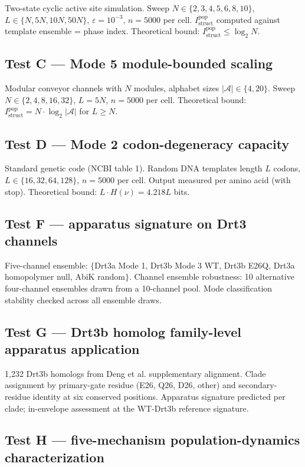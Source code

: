 \documentclass[aps,prx,reprint,amsmath,amssymb,floatfix,superscriptaddress,nofootinbib]{revtex4-2}
\theoremstyle{plain-thm}
\theoremstyle{definition-thm}
\newcommand{\Istructpop}{I_{\mathrm{struct}}^{\mathrm{pop}}}
\begin{document}
Two-state cyclic active site simulation. Sweep $N \in \{2, 3, 4, 5, 6, 8, 10\}$, $L \in \{N, 5N, 10N, 50N\}$, $\varepsilon = 10^{-3}$, $n = 5000$ per cell. $\Istructpop$ computed against template ensemble = phase index. Theoretical bound: $\Istructpop \le \log_2 N$.

\subsection{Test C --- Mode 5 module-bounded scaling}

Modular conveyor channels with $N$ modules, alphabet sizes $|\mathcal{A}| \in \{4, 20\}$. Sweep $N \in \{2, 4, 8, 16, 32\}$, $L = 5N$, $n = 5000$ per cell. Theoretical bound: $\Istructpop = N \cdot \log_2 |\mathcal{A}|$ for $L \ge N$.

\subsection{Test D --- Mode 2 codon-degeneracy capacity}

Standard genetic code (NCBI table 1). Random DNA templates length $L$ codons, $L \in \{16, 32, 64, 128\}$, $n = 5000$ per cell. Output measured per amino acid (with stop). Theoretical bound: $L \cdot H(\nu) = 4.218L$ bits.

\subsection{Test F --- apparatus signature on Drt3 channels}

Five-channel ensemble: $\{$Drt3a Mode 1, Drt3b Mode 3 WT, Drt3b E26Q, Drt3a homopolymer null, AbiK random$\}$. Channel ensemble robustness: 10 alternative four-channel ensembles drawn from a 10-channel pool. Mode classification stability checked across all ensemble draws.

\subsection{Test G --- Drt3b homolog family-level apparatus application}

1{,}232 Drt3b homologs from Deng et al. supplementary alignment. Clade assignment by primary-gate residue (E26, Q26, D26, other) and secondary-residue identity at six conserved positions. Apparatus signature predicted per clade; in-envelope assessment at the WT-Drt3b reference signature.

\subsection{Test H --- five-mechanism population-dynamics characterization}
\end{document}
